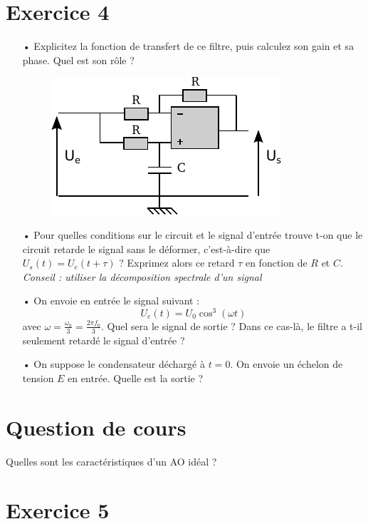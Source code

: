 \documentclass{report}
\begin{document}
\section*{Exercice 4}
\begin{itemize}
\item[•] Explicitez la fonction de transfert de ce filtre, puis calculez son gain et sa phase. Quel est son rôle ?
\begin{figure}[!h]
\centering
\includegraphics[width=0.5\linewidth]{circuit_.pdf}
\end{figure}

\item[•]
Pour quelles conditions sur le circuit et le signal d'entrée trouve t-on que le circuit retarde le signal sans le déformer, c'est-à-dire que $U_{s}(t)=U_{e}(t+\tau)$ ? Exprimez alors ce retard $\tau$ en fonction de $R$ et $C$.
\textit{Conseil : utiliser la décomposition spectrale d'un signal}
\item[•] On envoie en entrée le signal suivant :
\begin{equation}
U_{e}(t) = U_{0}\cos^{3}(\omega t)
\end{equation}
avec $\omega = \frac{\omega_{0}}{3} = \frac{2\pi f_{0}}{3}$.
Quel sera le signal de sortie ? Dans ce cas-là, le filtre a t-il seulement retardé le signal d'entrée ?

\item[•]
On suppose le condensateur déchargé à $t=0$. On envoie un échelon de tension $E$ en entrée. Quelle est la sortie ?
\end{itemize}

\newpage

\section*{Question de cours}
Quelles sont les caractéristiques d'un AO idéal ?

\section*{Exercice 5}
\end{document}
